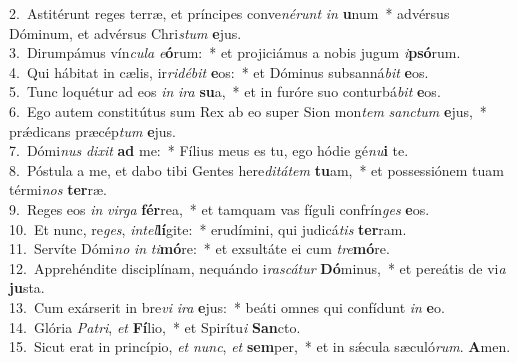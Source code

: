 {2.~}Astitérunt reges terræ, et príncipes conve\textit{né}\textit{runt} \textit{in} \textbf{u}num~* advérsus Dóminum, et advérsus Chri\textit{stum} \textbf{e}jus.\\
{3.~}Dirumpámus vín\textit{cu}\textit{la} \textit{e}\textbf{ó}rum:~* et projiciámus a nobis jugum \textit{i}\textbf{psó}rum.\\
{4.~}Qui hábitat in cælis, ir\textit{ri}\textit{dé}\textit{bit} \textbf{e}os:~* et Dóminus subsanná\textit{bit} \textbf{e}os.\\
{5.~}Tunc loquétur ad eos \textit{in} \textit{i}\textit{ra} \textbf{su}a,~* et in furóre suo conturbá\textit{bit} \textbf{e}os.\\
{6.~}Ego autem constitútus sum Rex ab eo super Sion mon\textit{tem} \textit{san}\textit{ctum} \textbf{e}jus,~* prǽdicans præcép\textit{tum} \textbf{e}jus.\\
{7.~}Dómi\textit{nus} \textit{di}\textit{xit} \textbf{ad} me:~* Fílius meus es tu, ego hódie gé\textit{nu}\textbf{i} te.\\
{8.~}Póstula a me, et dabo tibi Gentes here\textit{di}\textit{tá}\textit{tem} \textbf{tu}am,~* et possessiónem tuam térmi\textit{nos} \textbf{ter}ræ.\\
{9.~}Reges eos \textit{in} \textit{vir}\textit{ga} \textbf{fér}rea,~* et tamquam vas fíguli confrín\textit{ges} \textbf{e}os.\\
{10.~}Et nunc, re\textit{ges}, \textit{in}\textit{tel}\textbf{lí}gite:~* erudímini, qui judicá\textit{tis} \textbf{ter}ram.\\
{11.~}Servíte Dómi\textit{no} \textit{in} \textit{ti}\textbf{mó}re:~* et exsultáte ei cum \textit{tre}\textbf{mó}re.\\
{12.~}Apprehéndite disciplínam, nequándo i\textit{ra}\textit{scá}\textit{tur} \textbf{Dó}minus,~* et pereátis de vi\textit{a} \textbf{ju}sta.\\
{13.~}Cum exárserit in bre\textit{vi} \textit{i}\textit{ra} \textbf{e}jus:~* beáti omnes qui confídunt \textit{in} \textbf{e}o.\\
{14.~}Glória \textit{Pa}\textit{tri}, \textit{et} \textbf{Fí}lio,~* et Spirítu\textit{i} \textbf{San}cto.\\
{15.~}Sicut erat in princípio, \textit{et} \textit{nunc}, \textit{et} \textbf{sem}per,~* et in sǽcula sæculó\textit{rum}. \textbf{A}men.\\
